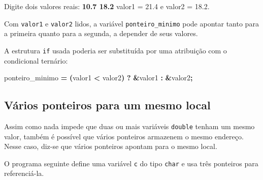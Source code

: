 \documentclass[
  11pt,
  a4paper,
]{scrbook}
\newenvironment{Shaded}{\begin{snugshade}}{\end{snugshade}}
\newcommand{\KeywordTok}[1]{\textcolor[rgb]{0.13,0.29,0.53}{\textbf{#1}}}
\newcommand{\NormalTok}[1]{#1}
\newcommand{\OperatorTok}[1]{\textcolor[rgb]{0.81,0.36,0.00}{\textbf{#1}}}
\begin{document}
\begin{Shaded}
\begin{Highlighting}[]
\NormalTok{Digite dois valores reais: }\KeywordTok{ 10.7 18.2 }
\NormalTok{valor1 = 21.4 e valor2 = 18.2.}
\end{Highlighting}
\end{Shaded}

Com \texttt{valor1} e \texttt{valor2} lidos, a variável
\texttt{ponteiro\_minimo} pode apontar tanto para a primeira quanto para
a segunda, a depender de seus valores.

A estrutura \texttt{if} usada poderia ser substituída por uma atribuição
com o condicional ternário:

\begin{Shaded}
\begin{Highlighting}[]
\NormalTok{ponteiro\_minimo }\OperatorTok{=} \OperatorTok{(}\NormalTok{valor1 }\OperatorTok{\textless{}}\NormalTok{ valor2}\OperatorTok{)} \OperatorTok{?} \OperatorTok{\&}\NormalTok{valor1 }\OperatorTok{:} \OperatorTok{\&}\NormalTok{valor2}\OperatorTok{;}
\end{Highlighting}
\end{Shaded}

\subsection{Vários ponteiros para um mesmo
local}\label{sec-exemplo-varios-ponteiros-para-mesmo-local}

Assim como nada impede que duas ou mais variáveis \texttt{double} tenham
um mesmo valor, também é possível que vários ponteiros armazenem o mesmo
endereço. Nesse caso, diz-se que vários ponteiros apontam para o mesmo
local.

O programa seguinte define uma variável \texttt{c} do tipo \texttt{char}
e usa três ponteiros para referenciá-la.
\end{document}
